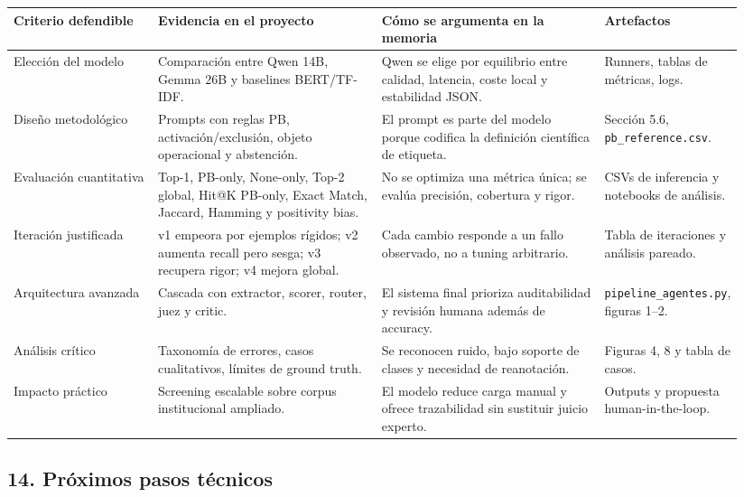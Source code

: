 \begin{center}
\scriptsize
\setlength{\tabcolsep}{4pt}
\renewcommand{\arraystretch}{1.18}
\begin{tabular}{p{0.20\linewidth}p{0.31\linewidth}p{0.31\linewidth}p{0.12\linewidth}}
\toprule
Criterio defendible & Evidencia en el proyecto & Cómo se argumenta en la memoria & Artefactos \\
\midrule
Elección del modelo & Comparación entre Qwen 14B, Gemma 26B y baselines BERT/TF-IDF. & Qwen se elige por equilibrio entre calidad, latencia, coste local y estabilidad JSON. & Runners, tablas de métricas, logs. \\
Diseño metodológico & Prompts con reglas PB, activación/exclusión, objeto operacional y abstención. & El prompt es parte del modelo porque codifica la definición científica de etiqueta. & Sección 5.6, \texttt{pb\_reference.csv}. \\
Evaluación cuantitativa & Top-1, PB-only, None-only, Top-2 global, Hit@K PB-only, Exact Match, Jaccard, Hamming y positivity bias. & No se optimiza una métrica única; se evalúa precisión, cobertura y rigor. & CSVs de inferencia y notebooks de análisis. \\
Iteración justificada & v1 empeora por ejemplos rígidos; v2 aumenta recall pero sesga; v3 recupera rigor; v4 mejora global. & Cada cambio responde a un fallo observado, no a tuning arbitrario. & Tabla de iteraciones y análisis pareado. \\
Arquitectura avanzada & Cascada con extractor, scorer, router, juez y critic. & El sistema final prioriza auditabilidad y revisión humana además de accuracy. & \texttt{pipeline\_agentes.py}, figuras 1--2. \\
Análisis crítico & Taxonomía de errores, casos cualitativos, límites de ground truth. & Se reconocen ruido, bajo soporte de clases y necesidad de reanotación. & Figuras 4, 8 y tabla de casos. \\
Impacto práctico & Screening escalable sobre corpus institucional ampliado. & El modelo reduce carga manual y ofrece trazabilidad sin sustituir juicio experto. & Outputs y propuesta human-in-the-loop. \\
\bottomrule
\end{tabular}
\end{center}

\subsection{14. Próximos pasos técnicos}

